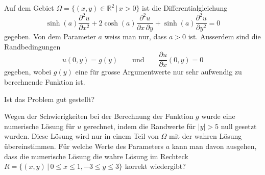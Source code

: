 Auf dem Gebiet $\Omega=\{(x,y)\in\mathbb R^2\,|\, x>0\}$ ist die
Differentialgleichung
\begin{equation}
\sinh(a)\frac{\partial^2 u}{\partial x^2}
+
2\cosh(a)\frac{\partial^2 u}{\partial x\,\partial y}
+
\sinh(a)\frac{\partial^2 u}{\partial y^2}
=
0
\label{90000013:dgl}
\end{equation}
gegeben.
Von dem Parameter $a$ weiss man nur, dass $a>0$ ist.
Ausserdem sind die Randbedingungen
\[
u(0,y)=g(y)\qquad\text{und}\qquad \frac{\partial u}{\partial x}(0,y)=0
\]
gegeben, wobei $g(y)$ eine für grosse Argumentwerte nur sehr aufwendig zu
berechnende Funktion ist.
\begin{teilaufgaben}
\item
Ist das Problem gut gestellt?
\item
Wegen der Schwierigkeiten bei der Berechnung der Funktion $g$
wurde eine numerische Lösung für $u$ gerechnet, indem die
Randwerte für $|y|>5$ null gesetzt wurden.
Diese Lösung wird nur in einem Teil von $\Omega$ mit der wahren Lösung
übereinstimmen.
Für welche Werte des Parameters $a$ kann man davon ausgehen, dass die
numerische Lösung die wahre Lösung im Rechteck
$R=\{(x,y)\,|\, 0\le x\le 1,-3\le y\le 3\}$ korrekt
wiedergibt?
\end{teilaufgaben}


